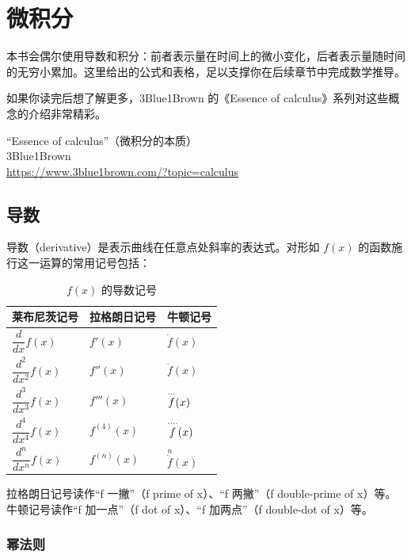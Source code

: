 ﻿
\chapter{微积分}

本书会偶尔使用导数和积分：前者表示量在时间上的微小变化，后者表示量随时间的无穷小累加。这里给出的公式和表格，足以支撑你在后续章节中完成数学推导。

如果你读完后想了解更多，3Blue1Brown 的《Essence of calculus》系列对这些概念的介绍非常精彩。

\begin{media}[视频资源]
``Essence of calculus''（微积分的本质）\\
3Blue1Brown\\
\url{https://www.3blue1brown.com/?topic=calculus}
\end{media}

\section{导数}
\label{sec:derivatives}

导数（derivative）是表示曲线在任意点处斜率的表达式。对形如 $f(x)$ 的函数施行这一运算的常用记号包括：

\begin{table}[htbp]
  \centering
  \begin{tabular}{lll}
    \toprule
    莱布尼茨记号 & 拉格朗日记号 & 牛顿记号 \\
    \midrule
    $\dfrac{d}{dx} f(x)$  & $f'(x)$    & $\dot{f}(x)$ \\
    $\dfrac{d^2}{dx^2} f(x)$ & $f''(x)$ & $\ddot{f}(x)$ \\
    $\dfrac{d^3}{dx^3} f(x)$ & $f'''(x)$ & $\overset{\cdot\cdot\cdot}{f}(x)$ \\
    $\dfrac{d^4}{dx^4} f(x)$ & $f^{(4)}(x)$ & $\overset{\cdot\cdot\cdot\cdot}{f}(x)$ \\
    $\dfrac{d^n}{dx^n} f(x)$ & $f^{(n)}(x)$ & $\overset{n}{\dot{f}}(x)$ \\
    \bottomrule
  \end{tabular}
  \caption{$f(x)$ 的导数记号}
  \label{tab:deriv-notation}
\end{table}

拉格朗日记号读作``f 一撇''（f prime of x）、``f 两撇''（f double-prime of x）等。牛顿记号读作``f 加一点''（f dot of x）、``f 加两点''（f double-dot of x）等。

\subsection{幂法则}
\label{sec:powerrule}

